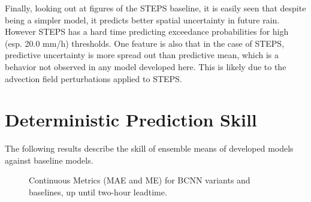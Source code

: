 Finally, looking out at figures of the STEPS baseline, it is easily seen that despite being a simpler model, it predicts better spatial uncertainty in future rain. However STEPS has a hard time predicting exceedance probabilities for high (esp. 20.0 mm/h) thresholds. One feature is also that in the case of STEPS, predictive uncertainty is more spread out than predictive mean, which is a behavior not observed in any model developed here. This is likely due to the advection field perturbations applied to STEPS.


\section{Deterministic Prediction Skill}

The following results describe the skill of ensemble means of developed models against baseline models.%

\begin{figure}[H]
	\centering

	\caption{Continuous Metrics (MAE and ME) for BCNN variants and baselines, up until two-hour leadtime.}
	\label{fig:cont-metrics}
\end{figure}

